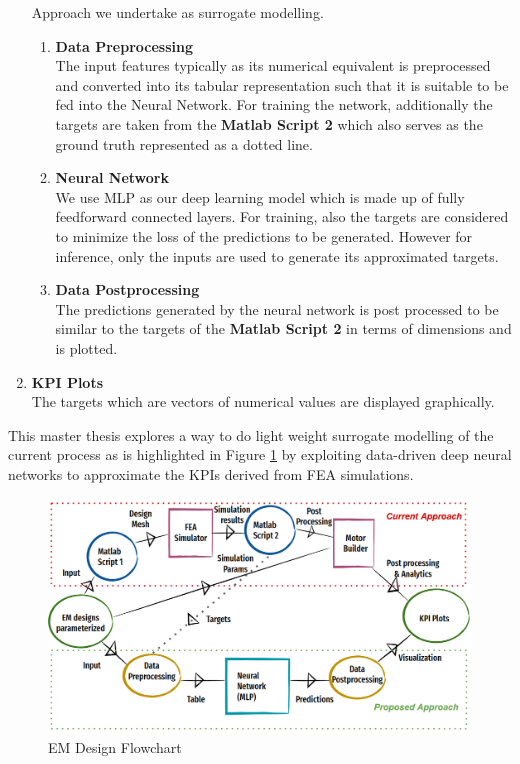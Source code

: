 \documentclass{report} %
\begin{document}
\begin{enumerate}
    Approach we undertake as surrogate modelling.
    \begin{enumerate}
        \item \textbf{Data Preprocessing} \\
        The input features typically as its numerical equivalent is preprocessed and converted into its tabular representation such that it is suitable to be fed into the Neural Network.
        For training the network, additionally the targets are taken from the \textbf{Matlab Script 2} which also serves as the ground truth represented as a dotted line.
        \item \textbf{Neural Network} \\
        We use \ac{MLP} as our deep learning model which is made up of fully feedforward connected layers. For training, also the targets are considered to minimize the loss of the predictions to be generated.
        However for inference, only the inputs are used to generate its approximated targets.
        \item \textbf{Data Postprocessing} \\
        The predictions generated by the neural network is post processed to be similar to the targets of the \textbf{Matlab Script 2} in terms of dimensions and is plotted.
    \end{enumerate}    
    \item \textbf{KPI Plots} \\
    The targets which are vectors of numerical values are displayed graphically.
\end{enumerate}

This master thesis explores a way to do light weight surrogate modelling of the current process as is highlighted in Figure \ref{fig:EM Design Flowchart} by 
exploiting data-driven deep neural networks to approximate the \ac{KPI}s derived from \ac{FEA} simulations.

\begin{figure}[H]
    \centering
    \includegraphics[width=1\textwidth]{./ReportImages/EM_design_flowchart_v2.png} 
    \caption{EM Design Flowchart}
    \label{fig:EM Design Flowchart}
\end{figure}
\end{document}
